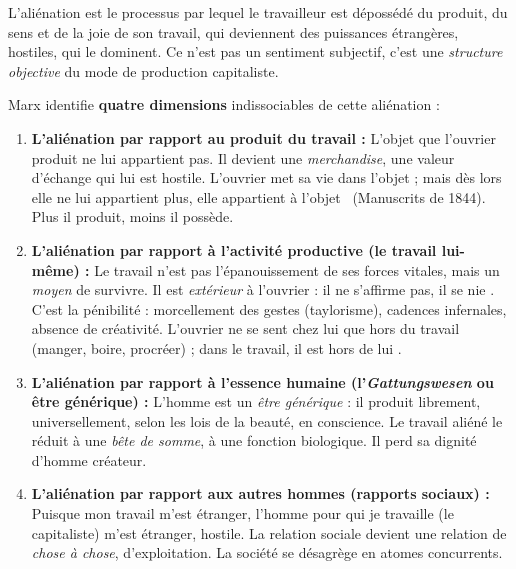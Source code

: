 \documentclass[11pt]{article}
\newcommand{\cle}[1]{{\popxbold\color{popdark}#1}}
\begin{document}
\begin{definition}
L'\cle{aliénation} est le processus par lequel le travailleur est dépossédé du produit, du sens et de la joie de son travail, qui deviennent des puissances étrangères, hostiles, qui le dominent. Ce n'est pas un sentiment subjectif, c'est une \emph{structure objective} du mode de production capitaliste.
\end{definition}

Marx identifie \textbf{quatre dimensions} indissociables de cette aliénation :

\begin{enumerate}
    \item \textbf{L'aliénation par rapport au produit du travail :} L'objet que l'ouvrier produit ne lui appartient pas. Il devient une \emph{merchandise}, une valeur d'échange qui lui est hostile. \guillemotleft L'ouvrier met sa vie dans l'objet ; mais dès lors elle ne lui appartient plus, elle appartient à l'objet \guillemotright\ (Manuscrits de 1844). Plus il produit, moins il possède.
    \item \textbf{L'aliénation par rapport à l'activité productive (le travail lui-même) :} Le travail n'est pas l'épanouissement de ses forces vitales, mais un \emph{moyen} de survivre. Il est \emph{extérieur} à l'ouvrier : \guillemotleft il ne s'affirme pas, il se nie \guillemotright. C'est la \cle{pénibilité} : morcellement des gestes (taylorisme), cadences infernales, absence de créativité. L'ouvrier ne se sent \guillemotleft chez lui \guillemotright que hors du travail (manger, boire, procréer) ; dans le travail, il est \guillemotleft hors de lui \guillemotright.
    \item \textbf{L'aliénation par rapport à l'essence humaine (l'\emph{Gattungswesen} ou être générique) :} L'homme est un \emph{être générique} : il produit librement, universellement, selon les lois de la beauté, en conscience. Le travail aliéné le réduit à une \emph{bête de somme}, à une fonction biologique. Il perd sa dignité d'homme créateur.
    \item \textbf{L'aliénation par rapport aux autres hommes (rapports sociaux) :} Puisque mon travail m'est étranger, l'homme pour qui je travaille (le capitaliste) m'est étranger, hostile. La relation sociale devient une relation de \emph{chose à chose}, d'exploitation. La société se désagrège en atomes concurrents.
\end{enumerate}
\end{document}
